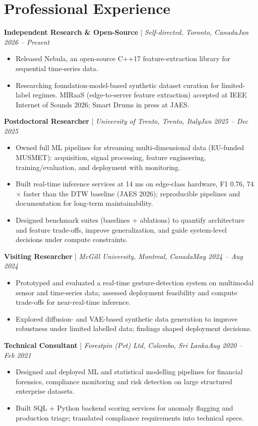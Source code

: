 \documentclass[11pt]{article}
\newenvironment{cvrole}[5]{%
  \par\noindent\textbf{\large #1} | \textit{\small #2, #3}\hfill \textit{\small #4 -- #5}\par
  \begin{itemize}[leftmargin=2em, itemsep=-0.3em, topsep=-0.5em]%
}{%
  \end{itemize}\par\noindent\mbox{}\par\vspace{0.1em}%
}
\begin{document}
\section*{Professional Experience}

\begin{cvrole}{Independent Research \& Open-Source}{Self-directed}{Toronto, Canada}{Jan 2026}{Present}
    \item Released Nebula, an open-source C++17 feature-extraction library for sequential time-series data.
    \item Researching foundation-model-based synthetic dataset curation for limited-label regimes. MIRaaS (edge-to-server feature extraction) accepted at IEEE Internet of Sounds 2026; Smart Drums in press at JAES.
\end{cvrole}

\begin{cvrole}{Postdoctoral Researcher}{University of Trento}{Trento, Italy}{Jan 2025}{Dec 2025}
    \item Owned full ML pipelines for streaming multi-dimensional data (EU-funded MUSMET): acquisition, signal processing, feature engineering, training/evaluation, and deployment with monitoring.
    \item Built real-time inference services at 14 ms on edge-class hardware, F1 0.76, 74$\times$ faster than the DTW baseline (JAES 2026); reproducible pipelines and documentation for long-term maintainability.
    \item Designed benchmark suites (baselines + ablations) to quantify architecture and feature trade-offs, improve generalization, and guide system-level decisions under compute constraints.
\end{cvrole}

\begin{cvrole}{Visiting Researcher}{McGill University}{Montreal, Canada}{May 2024}{Aug 2024}
    \item Prototyped and evaluated a real-time gesture-detection system on multimodal sensor and time-series data; assessed deployment feasibility and compute trade-offs for near-real-time inference.
    \item Explored diffusion- and VAE-based synthetic data generation to improve robustness under limited labelled data; findings shaped deployment decisions.
\end{cvrole}

\begin{cvrole}{Technical Consultant}{Forestpin (Pvt) Ltd}{Colombo, Sri Lanka}{Aug 2020}{Feb 2021}
    \item Designed and deployed ML and statistical modelling pipelines for financial forensics, compliance monitoring and risk detection on large structured enterprise datasets.
    \item Built SQL + Python backend scoring services for anomaly flagging and production triage; translated compliance requirements into technical specs.
\end{cvrole}
\end{document}
